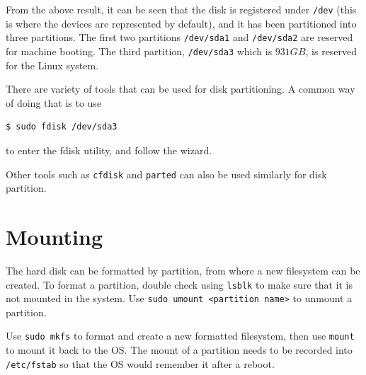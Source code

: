 From the above result, it can be seen that the disk is registered under \verb|/dev| (this is where the devices are represented by default), and it has been partitioned into three partitions. The first two partitions \verb|/dev/sda1| and \verb|/dev/sda2| are reserved for machine booting. The third partition, \verb|/dev/sda3| which is $931GB$, is reserved for the Linux system.

There are variety of tools that can be used for disk partitioning. A common way of doing that is to use
\begin{lstlisting}
$ sudo fdisk /dev/sda3
\end{lstlisting}
to enter the fdisk utility, and follow the wizard.

Other tools such as \verb|cfdisk| and \verb|parted| can also be used similarly for disk partition.

\section{Mounting}

The hard disk can be formatted by partition, from where a new filesystem can be created. To format a partition, double check using \verb|lsblk| to make sure that it is not mounted in the system. Use \verb|sudo umount <partition name>| to unmount a partition.

Use \verb|sudo mkfs| to format and create a new formatted filesystem, then use \verb|mount| to mount it back to the OS. The mount of a partition needs to be recorded into \verb|/etc/fstab| so that the OS would remember it after a reboot.
